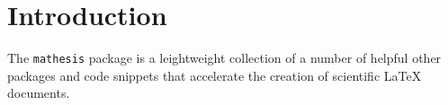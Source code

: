 \section{Introduction}
The \verb|mathesis| package is a leightweight collection of a number of helpful other packages and code snippets that accelerate the creation of scientific LaTeX documents. 
